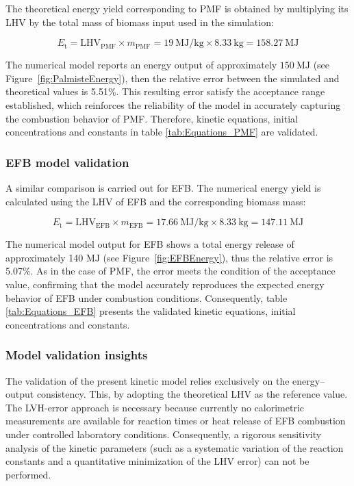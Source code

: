 \documentclass[preprint,12pt]{elsarticle}
\begin{document}
The theoretical energy yield corresponding to PMF is obtained by multiplying its LHV by the total mass of biomass input used in the simulation:

\[
E_{\text{t}} = \text{LHV}_{\text{PMF}} \times m_{\text{PMF}} = 19\ \text{MJ/kg} \times 8.33\ \text{kg} = 158.27\ \text{MJ}
\]

The numerical model reports an energy output of approximately $150\ \text{MJ}$ (see Figure~\ref{fig:PalmisteEnergy}), then the relative error between the simulated and theoretical values is 5.51\%. This resulting error satisfy the acceptance range established, which reinforces the reliability of the model in accurately capturing the combustion behavior of PMF. Therefore, kinetic equations, initial concentrations and constants in table \ref{tab:Equations_PMF} are validated.\\

\subsubsection{EFB model validation}
\label{efbmodelval}
A similar comparison is carried out for EFB. The numerical energy yield is calculated using the LHV of EFB and the corresponding biomass mass:

\[
E_{\text{t}} = \text{LHV}_{\text{EFB}} \times m_{\text{EFB}} = 17.66\ \text{MJ/kg} \times 8.33\ \text{kg} = 147.11\ \text{MJ}
\]

The numerical model output for EFB shows a total energy release of approximately 140  
 $\text{MJ}$ (see Figure~\ref{fig:EFBEnergy}), thus the relative error is 5.07\%. As in the case of PMF, the error meets the condition of the acceptance value, confirming that the model accurately reproduces the expected energy behavior of EFB under combustion conditions. Consequently, table \ref{tab:Equations_EFB} presents the validated kinetic equations, initial concentrations and constants.\\

 \subsubsection{Model validation insights}

The validation of the present kinetic model relies exclusively on the energy–output consistency. This, by adopting the theoretical LHV as the reference value. The LVH-error approach is necessary because currently no calorimetric measurements are available for reaction times or heat release of EFB combustion under controlled laboratory conditions. Consequently, a rigorous sensitivity analysis of the kinetic parameters (such as a systematic variation of the reaction constants and a quantitative minimization of the LHV error) can not be performed.\\
\end{document}
